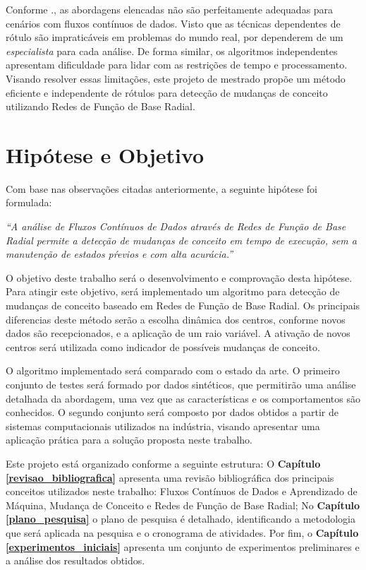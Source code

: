 \documentclass[qual, classic, a4paper]{ufbathesis}
\begin{document}
Conforme \cite{Aggarwal:2004:DCD:1014052.1014110}., as abordagens elencadas não são perfeitamente adequadas para cenários com fluxos contínuos de dados.
Visto que as técnicas dependentes de rótulo são impraticáveis em problemas do mundo real, por dependerem de um \textit{especialista} para cada análise.
De forma similar, os algoritmos independentes apresentam dificuldade para lidar com as restrições de tempo e processamento.
Visando resolver essas limitações, este projeto de mestrado propõe um método eficiente e independente de rótulos para detecção de mudanças de conceito utilizando Redes de Função de Base Radial.

\section{Hipótese e Objetivo}

Com base nas observações citadas anteriormente, a seguinte hipótese foi formulada:

\begin{center}
\textit{``A análise de Fluxos Contínuos de Dados através de Redes de Função de Base Radial permite a detecção de mudanças de conceito 
em tempo de execução, sem a manutenção de estados pŕevios e com alta acurácia.''}
\end{center}

O objetivo deste trabalho será o desenvolvimento e comprovação desta hipótese.
Para atingir este objetivo, será implementado um algoritmo para detecção de mudanças de conceito baseado em Redes de Função de Base Radial. 
Os principais diferencias deste método serão a escolha dinâmica dos centros, conforme novos dados são recepcionados, e a aplicação de um raio variável.
A ativação de novos centros será utilizada como indicador de possíveis mudanças de conceito.

O algoritmo implementado será comparado com o estado da arte. 
O primeiro conjunto de testes será formado por dados sintéticos, que permitirão uma análise detalhada da abordagem, uma vez que as características e os comportamentos são conhecidos. 
O segundo conjunto será composto por dados obtidos a partir de sistemas computacionais utilizados na indústria,
visando apresentar uma aplicação prática para a solução proposta neste trabalho. 

Este projeto está organizado conforme a seguinte estrutura: 
O \textbf{Capítulo \ref{revisao_bibliografica}} apresenta uma revisão bibliográfica dos principais conceitos utilizados neste trabalho: Fluxos Contínuos de Dados e Aprendizado de Máquina, Mudança de Conceito e Redes de Função de Base Radial; 
No \textbf{Capítulo \ref{plano_pesquisa}} o plano de pesquisa é detalhado, 
identificando a metodologia que será aplicada na pesquisa e o cronograma de atividades. 
Por fim, o \textbf{Capítulo \ref{experimentos_iniciais}} 
apresenta um conjunto de experimentos preliminares e a análise dos resultados obtidos.
\end{document}

